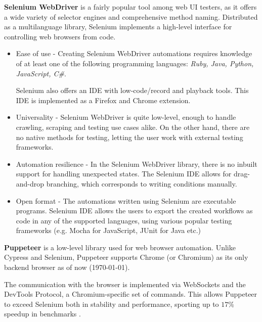 \textbf{Selenium WebDriver} is a fairly popular tool among web UI testers, as it offers a wide variety of selector engines and comprehensive method naming.
Distributed as a multilanguage library, Selenium implements a high-level interface for controlling web browsers from code.
\begin{itemize}
    \item Ease of use - Creating Selenium WebDriver automations requires knowledge of at least one of the following programming languages: \textit{Ruby, Java, Python, JavaScript, C\#}.
    
    Selenium also offers an \ac{IDE} with low-code/record and playback tools. This \ac{IDE} is implemented as a Firefox and Chrome extension.

    \item Universality - Selenium WebDriver is quite low-level, enough to handle crawling, scraping and testing use cases alike. 
    On the other hand, there are no native methods for testing, letting the user work with external testing frameworks.

    \item Automation resilience -
    In the Selenium WebDriver library, there is no inbuilt support for handling unexpected states.
    The Selenium IDE allows for drag-and-drop branching, which corresponds to writing conditions manually. 
    \item Open format - The automations written using Selenium are executable programs. 
    Selenium IDE allows the users to export the created workflows as code in any of the supported languages, using various popular testing frameworks (e.g. Mocha for JavaScript, JUnit for Java etc.)
\end{itemize}


\textbf{Puppeteer} is a low-level library used for web browser automation. 
Unlike Cypress and Selenium, Puppeteer supports Chrome (or Chromium) as its only backend browser as of now (\today).

The communication with the browser is implemented via WebSockets and the DevTools Protocol, a Chromium-specific set of commands.
This allows Puppeteer to exceed Selenium both in stability and performance, sporting up to $17\%$ speedup in benchmarks .

